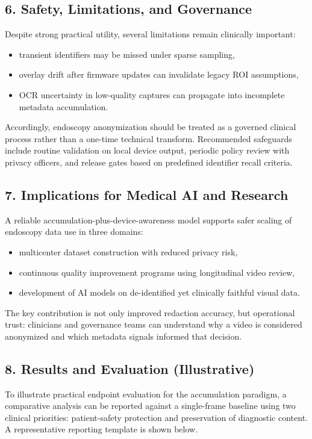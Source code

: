 \subsection*{6. Safety, Limitations, and Governance}
Despite strong practical utility, several limitations remain clinically
important:
\begin{itemize}
  \item transient identifiers may be missed under sparse sampling,
  \item overlay drift after firmware updates can invalidate legacy ROI
  assumptions,
  \item OCR uncertainty in low-quality captures can propagate into incomplete
  metadata accumulation.
\end{itemize}

Accordingly, endoscopy anonymization should be treated as a governed clinical
process rather than a one-time technical transform. Recommended safeguards
include routine validation on local device output, periodic policy review with
privacy officers, and release gates based on predefined identifier recall
criteria.

\subsection*{7. Implications for Medical AI and Research}
A reliable accumulation-plus-device-awareness model supports safer scaling of
endoscopy data use in three domains:
\begin{itemize}
  \item multicenter dataset construction with reduced privacy risk,
  \item continuous quality improvement programs using longitudinal video review,
  \item development of AI models on de-identified yet clinically faithful visual
  data.
\end{itemize}

The key contribution is not only improved redaction accuracy, but operational
trust: clinicians and governance teams can understand why a video is considered
anonymized and which metadata signals informed that decision.

\subsection*{8. Results and Evaluation (Illustrative)}
To illustrate practical endpoint evaluation for the accumulation paradigm, a
comparative analysis can be reported against a single-frame baseline using two
clinical priorities: patient-safety protection and preservation of diagnostic
content. A representative reporting template is shown below.

